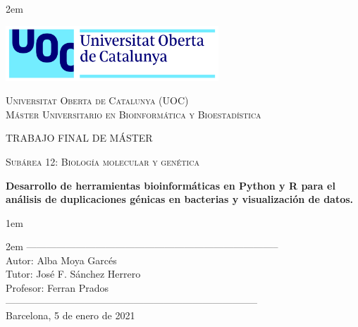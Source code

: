 \newpage
\thispagestyle{empty}

\baselineskip 2em


\centerline{\includegraphics[width=0.6\textwidth]{images/UOC-logo}}
\begin{center}
\textsc{Universitat Oberta de Catalunya (UOC) \\
 Máster Universitario en Bioinformática y Bioestadística\\}


\vspace*{1.5cm}

\textsc{\Large TRABAJO FINAL DE MÁSTER}

\vspace*{0.5cm}

\textsc{\large Subárea 12: Biología molecular y genética}



\vspace*{2.0cm}

\textbf{\Large Desarrollo de herramientas bioinformáticas en Python y R para el análisis de duplicaciones génicas en bacterias y visualización de datos.}


\vspace{2.5cm}
\baselineskip 1em

\baselineskip 2em
-----------------------------------------------------------------------------\\
Autor:      Alba Moya Garcés\\
Tutor:      José F. Sánchez Herrero\\
Profesor:   Ferran Prados\\
-----------------------------------------------------------------------------\\
\vspace*{1.5cm}
Barcelona, 5 de enero de 2021

\end{center}

\newpage
\pagestyle{empty}
\hfill
